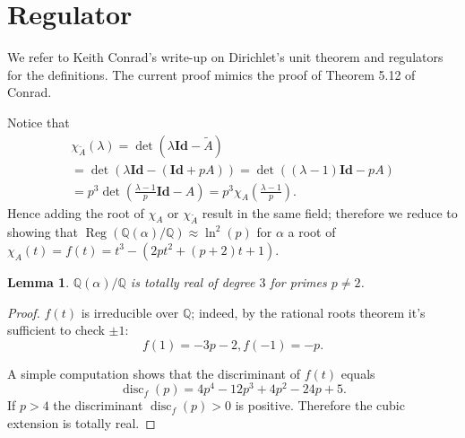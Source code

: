 \documentclass[a4paper]{article}
\newtheorem{Lem}[Thm]{Lemma}
\newcommand{\Q}{\mathbb{Q}}        %
\newcommand{\Id}{\mathbf{Id}}        %
\DeclareMathOperator{\Reg}{Reg}        %
\DeclareMathOperator{\disc}{disc}        %
\begin{document}
\section{Regulator}
We refer to Keith Conrad's write-up on Dirichlet's unit theorem and regulators \cite{conraddirichlet} for the definitions.
The current proof mimics the proof of Theorem 5.12 of Conrad.

Notice that 
\begin{multline}
	\label{computation_char_poly_of_a_tilde}
\chi_{\tilde A}(\lambda) 
= \det(\lambda \Id - \tilde A) \\
= \det(\lambda \Id - (\Id + p A))
= \det((\lambda - 1) \Id - p A)\\
= p^3 \det(\frac{\lambda - 1}p \Id - A)
= p^3 \chi_A(\frac{\lambda - 1}p)
.\end{multline}
Hence adding the root of $\chi_{A}$ or $\chi_{\tilde A}$ result in the same field; therefore we reduce to showing that 
$\Reg ( \Q(\alpha)/\Q ) \approx \ln^2(p) $ for $\alpha$ a root of $\chi_{A}(t) = f(t) = t^3 - (2p t^2 + (p + 2) t + 1) $.

\begin{Lem}
$\Q(\alpha)/\Q$ is totally real of degree $3$ for primes $p \ne 2$.
\end{Lem}
\begin{proof}
$f(t)$ is irreducible over $\Q$; indeed, by the rational roots theorem it's sufficient to check $\pm 1$:
$$f(1) = - 3 p - 2, f(-1) = - p .$$

A simple computation shows that the discriminant of $f(t)$ equals 
\[
	\disc_f(p) = 4 p^4 - 12 p^3 + 4 p^2 - 24 p + 5
.\]
If $p > 4$ the discriminant  $\disc_f(p) > 0$ is positive.
Therefore the cubic extension is totally real.
\end{proof}
\end{document}
